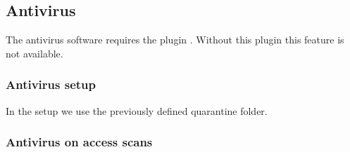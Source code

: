 

\subsection{Antivirus}\label{sec:antivirus}

The antivirus software requires the plugin . Without this
plugin this feature is not available.

\subsubsection{Antivirus setup}

In the setup we use the previously defined quarantine folder.


\subsubsection{Antivirus on access scans}

